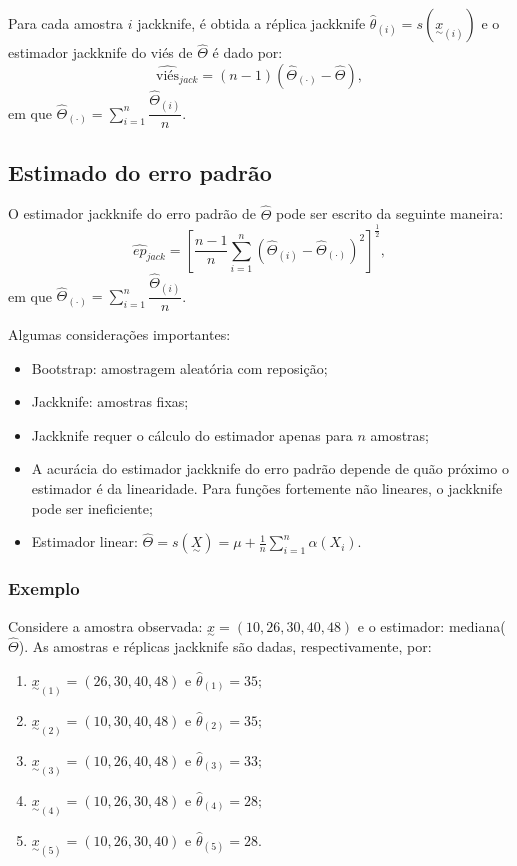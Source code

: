 \documentclass[
  letterpaper,
  DIV=11,
  numbers=noendperiod]{scrreprt}
\providecommand{\tightlist}{%
  \setlength{\itemsep}{0pt}\setlength{\parskip}{0pt}}\usepackage{longtable,booktabs,array}
\begin{document}
Para cada amostra \(i\) jackknife, é obtida a réplica jackknife
\(\hat{\theta}_{(i)}=s({\underset{\sim}{x}}_{(i)})\) e o estimador
jackknife do viés de \(\hat{\Theta}\) é dado por:
\[\widehat{\mbox{viés}}_{jack} =(n-1)( \hat{\Theta}_{(\cdot)} - \hat{\Theta} ),\]
em que
\(\hat{\Theta}_{(\cdot)}=\sum_{i=1}^n\dfrac{\hat{\Theta}_{(i)}}{n}\).

\subsection{Estimado do erro padrão}\label{estimado-do-erro-padruxe3o}

O estimador jackknife do erro padrão de \(\hat{\Theta}\) pode ser
escrito da seguinte maneira:
\[\widehat{ep}_{jack} =\left[ \dfrac{n-1}{n}\sum_{i=1}^n (\hat{\Theta}_{(i)} - \hat{\Theta}_{(\cdot)})^2\right]^{\frac{1}{2}},\]
em que
\(\hat{\Theta}_{(\cdot)}=\sum_{i=1}^n\dfrac{\hat{\Theta}_{(i)}}{n}\).

Algumas considerações importantes:

\begin{itemize}
\item
  Bootstrap: amostragem aleatória com reposição;
\item
  Jackknife: amostras fixas;
\item
  Jackknife requer o cálculo do estimador apenas para \(n\) amostras;
\item
  A acurácia do estimador jackknife do erro padrão depende de quão
  próximo o estimador é da linearidade. Para funções fortemente não
  lineares, o jackknife pode ser ineficiente;
\item
  Estimador linear:
  \(\hat{\Theta}=s(\underset{\sim}{X})=\mu +\frac{1}{n}\sum_{i=1}^n\alpha(X_i).\)
\end{itemize}

\subsubsection{Exemplo}\label{exemplo-7}

Considere a amostra observada: \(\underset{\sim}{x}=(10,26,30,40,48)\) e
o estimador: mediana(\(\hat{\Theta}\)). As amostras e réplicas jackknife
são dadas, respectivamente, por:

\begin{enumerate}
\def\labelenumi{\arabic{enumi}.}
\tightlist
\item
  \({\underset{\sim}{x}}_{(1)}=(26,30,40,48)\) e
  \(\hat{\theta}_{(1)}=35;\)
\item
  \({\underset{\sim}{x}}_{(2)}=(10,30,40,48)\) e
  \(\hat{\theta}_{(2)}=35;\)
\item
  \({\underset{\sim}{x}}_{(3)}=(10,26,40,48)\) e
  \(\hat{\theta}_{(3)}=33;\)
\item
  \({\underset{\sim}{x}}_{(4)}=(10,26,30,48)\) e
  \(\hat{\theta}_{(4)}=28;\)
\item
  \({\underset{\sim}{x}}_{(5)}=(10,26,30,40)\) e
  \(\hat{\theta}_{(5)}=28.\)
\end{enumerate}
\end{document}
